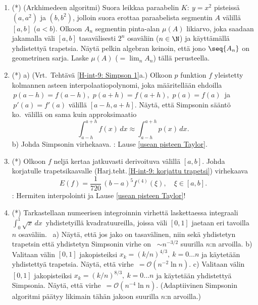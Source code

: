 \begin{enumerate}
\item(*) \label{H-int-9: Arkhimedes} 
(Arkhimedeen algoritmi) Suora leikkaa paraabelin $K:\ y=x^2$ pisteissä $(a,a^2)$ ja 
$(b,b^2)$, jolloin suora erottaa paraabelista segmentin $A$ välillä $[a,b]$ ($a<b$). Olkoon 
$A_n$ segmentin pinta-alan $\mu(A)$ likiarvo, joka saadaan jakamalla väli $[a,b]$ tasavälisesti
$2^n$ osaväliin ($n\in\N$) ja käyttämällä yhdistettyä trapetsia. Näytä pelkin algebran keinoin,
että jono $\seq{A_n}$ on geometrinen sarja. Laske $\mu(A)$ ($=\lim_n A_n$) tällä perusteella.

\item (*) \label{H-int-9: Simpsonin 2}
a) (Vrt.\ Tehtävä \ref{H-int-9: Simpson 1}a.) Olkoon $p$ funktion $f$ yleistetty kolmannen
asteen interpolaatiopolynomi, joka määritellään ehdoilla $\,p(a-h)=f(a-h)$, $\,p(a+h)=f(a+h)$,
$\,p(a)=f(a)\,$ ja $\,p'(a)=f'(a)$ välillä $[a-h,a+h]$. Näytä, että Simpsonin sääntö ko.\
välillä on sama kuin approksimaatio
\[
\int_{a-h}^{a+h} f(x)\,dx \approx \int_{a-h}^{a+h} p(x)\,dx.
\]
b) Johda Simpsonin virhekaava. : Lause \ref{usean pisteen Taylor}.

\item (*) \label{H-int-9: korjatun trapetsin virhe}
Olkoon $f$ neljä kertaa jatkuvasti derivoituva välillä $[a,b]$. Johda korjatulle
trapetsikaavalle (Harj.teht.\,\ref{H-int-9: korjattu trapetsi}) virhekaava
\[
E(f) = \frac{1}{720}\,(b-a)^5 f^{(4)}(\xi), \quad \xi\in[a,b].
\]
: Hermiten interpolointi ja Lause \ref{usean pisteen Taylor}!

\item (*) \label{H-int-9: sqrt-integraali}
Tarkastellaan numeerisen integroinnin virhettä laskettaessa integraali $\int_0^1\sqrt{x}\,dx\,$
yhdistetyillä kvadratuureilla, joissa väli $[0,1]$ jaetaan eri tavoilla $n$ 
osaväliin. \vspace{1mm}\newline
\ a) Näytä, että jos jako on tasavälinen, niin sekä yhdistetyn trapetsin että yhdistetyn
Simpsonin virhe on \ $\sim n^{-3/2}$ suurilla $n$:n arvoilla. \newline 
b) Valitaan välin $[0,1]$ jakopisteiksi $x_k=(k/n)^{4/3},\ k=0 \ldots n$ ja käytetään
yhdistettyä trapetsia. Näytä, että virhe $\,=\mathcal{O}(n^{-2}\ln n)$. \newline
c) Valitaan välin $[0,1]$ jakopisteiksi $x_k=(k/n)^{8/3},\ k=0 \ldots n$ ja \mbox{käytetään}
yhdistettyä Simpsonia. Näytä, että virhe $\,=\mathcal{O}(n^{-4}\ln n)$. (Adaptiivinen Simpsonin
algoritmi päätyy likimain tähän jakoon suurilla $n$:n arvoilla.)
 

\end{enumerate}
